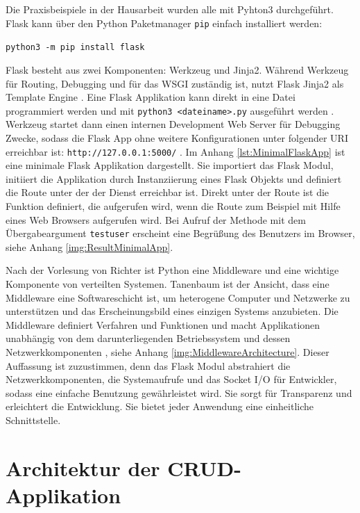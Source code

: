 \documentclass[a4paper,titlepage,halfparskip,12pt,listof=numbered]{scrreprt}
\begin{document}
\begin{onehalfspacing}
Die Praxisbeispiele in der Hausarbeit wurden alle mit Pyhton3 durchgeführt. Flask kann über den Python Paketmanager \texttt{pip} einfach installiert werden:

\texttt{python3 -m pip install flask}

Flask besteht aus zwei Komponenten: Werkzeug und Jinja2. Während Werkzeug für Routing, Debugging und für das \ac{WSGI} zuständig ist, nutzt Flask Jinja2 als Template Engine \cite[S.1]{pythonFlaskREST}. Eine Flask Applikation kann direkt in eine Datei programmiert werden und mit \texttt{python3 <dateiname>.py} ausgeführt werden \cite{flaskDevelopmentServer}. Werkzeug startet dann einen internen Development Web Server für Debugging Zwecke, sodass die Flask App ohne weitere Konfigurationen unter folgender \acs{URI} erreichbar ist: \texttt{http://127.0.0.1:5000/} \cite{flaskDevelopmentServer}. Im Anhang \autoref{lst:MinimalFlaskApp} ist eine minimale Flask Applikation dargestellt. Sie importiert das Flask Modul, initiiert die Applikation durch Instanziierung eines Flask Objekts und definiert die Route unter der der Dienst erreichbar ist. Direkt unter der Route ist die Funktion definiert, die aufgerufen wird, wenn die Route zum Beispiel mit Hilfe eines Web Browsers aufgerufen wird. Bei Aufruf der Methode mit dem Übergabeargument \texttt{testuser} erscheint eine Begrüßung des Benutzers im Browser, siehe Anhang \autoref{img:ResultMinimalApp}.

Nach der Vorlesung von Richter \cite[S.21]{richterEinleitungVS} ist Python eine Middleware und eine wichtige Komponente von verteilten Systemen. Tanenbaum \cite[S.19f]{andrew2008distributed} ist der Ansicht, dass eine Middleware eine Softwareschicht ist, um heterogene Computer und Netzwerke zu unterstützen und das Erscheinungsbild eines einzigen Systems anzubieten. Die Middleware definiert Verfahren und Funktionen und macht Applikationen unabhängig von dem darunterliegenden Betriebssystem und dessen Netzwerkkomponenten \cite[S.21]{richterEinleitungVS}, siehe Anhang \autoref{img:MiddlewareArchitecture}. Dieser Auffassung ist zuzustimmen, denn das Flask Modul abstrahiert die Netzwerkkomponenten, die Systemaufrufe und das Socket I/O für Entwickler, sodass eine einfache Benutzung gewährleistet wird. Sie sorgt für Transparenz und erleichtert die Entwicklung. Sie bietet jeder Anwendung eine einheitliche Schnittstelle.
 
\section{Architektur der CRUD-Applikation}
\label{sec:ArchitekturCRUDapp}


\end{onehalfspacing}
\end{document}
